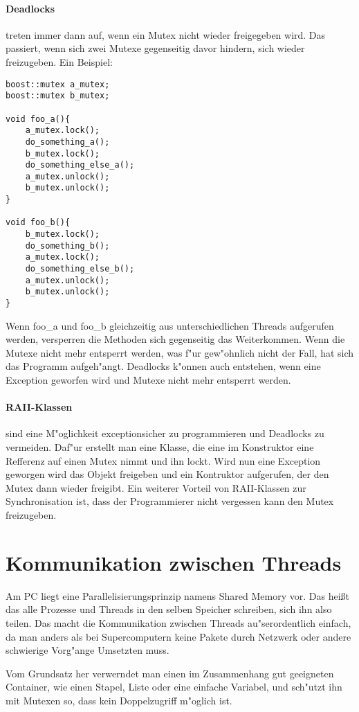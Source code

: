 \documentclass[14pt, a4paper]{report}
\begin{document}
\paragraph{Deadlocks} treten immer dann auf, wenn ein Mutex nicht wieder freigegeben 
wird. Das passiert, wenn sich zwei Mutexe gegenseitig davor hindern, sich wieder 
freizugeben. Ein Beispiel:
\begin{lstlisting}
boost::mutex a_mutex;
boost::mutex b_mutex;

void foo_a(){
	a_mutex.lock();
	do_something_a();
	b_mutex.lock();
	do_something_else_a();
	a_mutex.unlock();
	b_mutex.unlock();
}

void foo_b(){
	b_mutex.lock();
	do_something_b();
	a_mutex.lock();
	do_something_else_b();
	a_mutex.unlock();
	b_mutex.unlock();
}
\end{lstlisting}
Wenn foo\_a und foo\_b gleichzeitig aus unterschiedlichen Threads aufgerufen werden, 
versperren die Methoden sich gegenseitig das Weiterkommen. Wenn die Mutexe nicht mehr
entsperrt werden, was f"ur gew"ohnlich nicht der Fall, hat sich das Programm
aufgeh"angt. Deadlocks k"onnen auch entstehen, wenn eine Exception geworfen wird und
Mutexe nicht mehr entsperrt werden.

\paragraph{RAII-Klassen} sind eine M"oglichkeit exceptionsicher zu programmieren und 
Deadlocks zu vermeiden. Daf"ur erstellt man eine Klasse, die eine im Konstruktor eine 
Refferenz auf einen Mutex nimmt und ihn lockt. Wird nun eine Exception geworgen wird
das Objekt freigeben und ein Kontruktor aufgerufen, der den Mutex dann wieder freigibt.
Ein weiterer Vorteil von RAII-Klassen zur Synchronisation ist, dass der Programmierer 
nicht vergessen kann den Mutex freizugeben.

\section{Kommunikation zwischen Threads}
Am PC liegt eine Parallelisierungsprinzip namens Shared Memory vor. Das heißt das alle
Prozesse und Threads in den selben Speicher schreiben, sich ihn also teilen. Das macht
die Kommunikation zwischen Threads au"serordentlich einfach, da man anders als bei
Supercomputern keine Pakete durch Netzwerk oder andere schwierige Vorg"ange Umsetzten
muss. 

Vom Grundsatz her verwerndet man einen im Zusammenhang gut geeigneten Container, wie
einen Stapel, Liste oder eine einfache Variabel, und sch"utzt ihn mit Mutexen so, dass 
kein Doppelzugriff m"oglich ist.
\end{document}
